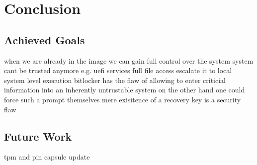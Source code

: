 
\chapter{Conclusion}

\section{Achieved Goals}
when we are already in the image we can gain full control over the system
system cant be trusted anymore e.g. uefi services
full file access
escalate it to local system level execution
bitlocker has the flaw of allowing to enter criticial information into an inherently untrustable system
on the other hand one could force such a prompt themselves
mere exisitence of a recovery key is a security flaw

\section{Future Work}
tpm and pin
capsule update